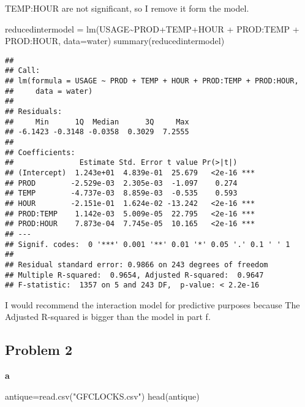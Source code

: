 \documentclass[
]{article}
\newenvironment{Shaded}{\begin{snugshade}}{\end{snugshade}}
\newcommand{\AttributeTok}[1]{\textcolor[rgb]{0.77,0.63,0.00}{#1}}
\newcommand{\FunctionTok}[1]{\textcolor[rgb]{0.00,0.00,0.00}{#1}}
\newcommand{\NormalTok}[1]{#1}
\newcommand{\OtherTok}[1]{\textcolor[rgb]{0.56,0.35,0.01}{#1}}
\newcommand{\SpecialCharTok}[1]{\textcolor[rgb]{0.00,0.00,0.00}{#1}}
\newcommand{\StringTok}[1]{\textcolor[rgb]{0.31,0.60,0.02}{#1}}
\begin{document}
TEMP:HOUR are not significant, so I remove it form the model.

\begin{Shaded}
\begin{Highlighting}[]
\NormalTok{reducedintermodel }\OtherTok{=} \FunctionTok{lm}\NormalTok{(USAGE}\SpecialCharTok{\textasciitilde{}}\NormalTok{PROD}\SpecialCharTok{+}\NormalTok{TEMP}\SpecialCharTok{+}\NormalTok{HOUR }\SpecialCharTok{+}\NormalTok{ PROD}\SpecialCharTok{:}\NormalTok{TEMP }\SpecialCharTok{+}\NormalTok{ PROD}\SpecialCharTok{:}\NormalTok{HOUR, }\AttributeTok{data=}\NormalTok{water)}
\FunctionTok{summary}\NormalTok{(reducedintermodel)}
\end{Highlighting}
\end{Shaded}

\begin{verbatim}
## 
## Call:
## lm(formula = USAGE ~ PROD + TEMP + HOUR + PROD:TEMP + PROD:HOUR, 
##     data = water)
## 
## Residuals:
##     Min      1Q  Median      3Q     Max 
## -6.1423 -0.3148 -0.0358  0.3029  7.2555 
## 
## Coefficients:
##               Estimate Std. Error t value Pr(>|t|)    
## (Intercept)  1.243e+01  4.839e-01  25.679   <2e-16 ***
## PROD        -2.529e-03  2.305e-03  -1.097    0.274    
## TEMP        -4.737e-03  8.859e-03  -0.535    0.593    
## HOUR        -2.151e-01  1.624e-02 -13.242   <2e-16 ***
## PROD:TEMP    1.142e-03  5.009e-05  22.795   <2e-16 ***
## PROD:HOUR    7.873e-04  7.745e-05  10.165   <2e-16 ***
## ---
## Signif. codes:  0 '***' 0.001 '**' 0.01 '*' 0.05 '.' 0.1 ' ' 1
## 
## Residual standard error: 0.9866 on 243 degrees of freedom
## Multiple R-squared:  0.9654, Adjusted R-squared:  0.9647 
## F-statistic:  1357 on 5 and 243 DF,  p-value: < 2.2e-16
\end{verbatim}

I would recommend the interaction model for predictive purposes because
The Adjusted R-squared is bigger than the model in part f.

\hypertarget{problem-2}{%
\subsection{Problem 2}\label{problem-2}}

\textbf{a}

\begin{Shaded}
\begin{Highlighting}[]
\NormalTok{antique}\OtherTok{=}\FunctionTok{read.csv}\NormalTok{(}\StringTok{"GFCLOCKS.csv"}\NormalTok{)}
\FunctionTok{head}\NormalTok{(antique)}
\end{Highlighting}
\end{Shaded}
\end{document}

